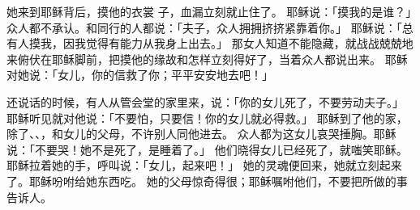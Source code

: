 {她来到耶稣背后，摸他的衣裳 子，血漏立刻就止住了。
耶稣说：「摸我的是谁？」众人都不承认。{}和同行的人都说：「夫子，众人拥拥挤挤紧靠着你。」
耶稣说：「总有人摸我，因我觉得有能力从我身上出去。」
那女人知道不能隐藏，就战战兢兢地来俯伏在耶稣脚前，把摸他的缘故和怎样立刻得好了，当着众人都说出来。
耶稣对她说：「女儿，你的信救了你；平平安安地去吧！」
\par }{\PP {}还说话的时候，有人从管会堂的家里来，说：「你的女儿死了，不要劳动夫子。」
耶稣听见就对他说：「不要怕，只要信！你的女儿就必得救。」
耶稣到了他的家，除了{}、{}、{}，和女儿的父母，不许别人同他进去。
众人都为这女儿哀哭捶胸。耶稣说：「不要哭！她不是死了，是睡着了。」
他们晓得女儿已经死了，就嗤笑耶稣。
耶稣拉着她的手，呼叫说：「女儿，起来吧！」
她的灵魂便回来，她就立刻起来了。耶稣吩咐给她东西吃。
她的父母惊奇得很；耶稣嘱咐他们，不要把所做的事告诉人。

}
